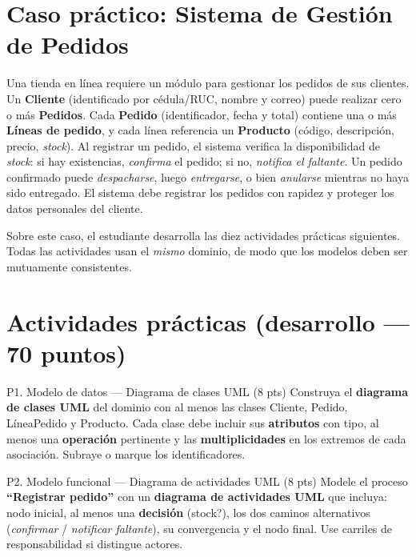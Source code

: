 \documentclass[11pt,a4paper,oneside]{article}
\begin{document}
\section{Caso pr\'actico: Sistema de Gesti\'on de Pedidos}

Una tienda en l\'inea requiere un m\'odulo para gestionar los pedidos de sus clientes. Un \textbf{Cliente} (identificado por c\'edula/RUC, nombre y correo) puede realizar cero o m\'as \textbf{Pedidos}. Cada \textbf{Pedido} (identificador, fecha y total) contiene una o m\'as \textbf{L\'ineas de pedido}, y cada l\'inea referencia un \textbf{Producto} (c\'odigo, descripci\'on, precio, \textit{stock}). Al registrar un pedido, el sistema verifica la disponibilidad de \textit{stock}: si hay existencias, \emph{confirma} el pedido; si no, \emph{notifica el faltante}. Un pedido confirmado puede \emph{despacharse}, luego \emph{entregarse}, o bien \emph{anularse} mientras no haya sido entregado. El sistema debe registrar los pedidos con rapidez y proteger los datos personales del cliente.

Sobre este caso, el estudiante desarrolla las diez actividades pr\'acticas siguientes. Todas las actividades usan el \emph{mismo} dominio, de modo que los modelos deben ser mutuamente consistentes.

\section{Actividades pr\'acticas (desarrollo --- 70 puntos)}

\begin{tarea}{P1. Modelo de datos --- Diagrama de clases UML \hfill (8 pts)}
Construya el \textbf{diagrama de clases UML} del dominio con al menos las clases \textsf{Cliente}, \textsf{Pedido}, \textsf{L\'ineaPedido} y \textsf{Producto}. Cada clase debe incluir sus \textbf{atributos} con tipo, al menos una \textbf{operaci\'on} pertinente y las \textbf{multiplicidades} en los extremos de cada asociaci\'on. Subraye o marque los identificadores.
\end{tarea}

\begin{tarea}{P2. Modelo funcional --- Diagrama de actividades UML \hfill (8 pts)}
Modele el proceso \textbf{``Registrar pedido''} con un \textbf{diagrama de actividades UML} que incluya: nodo inicial, al menos una \textbf{decisi\'on} (\textsf{\textquestiondown stock?}), los dos caminos alternativos (\emph{confirmar} / \emph{notificar faltante}), su convergencia y el nodo final. Use carriles de responsabilidad si distingue actores.
\end{tarea}
\end{document}

